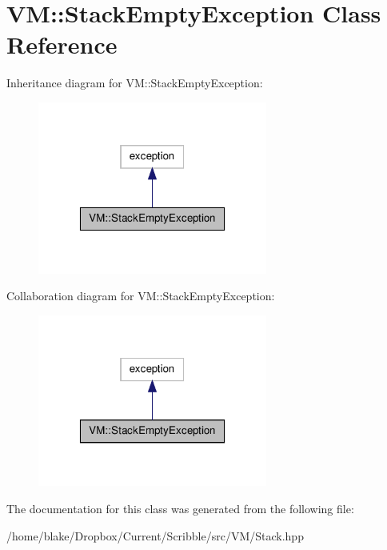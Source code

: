 \hypertarget{class_v_m_1_1_stack_empty_exception}{\section{V\-M\-:\-:Stack\-Empty\-Exception Class Reference}
\label{class_v_m_1_1_stack_empty_exception}
}


Inheritance diagram for V\-M\-:\-:Stack\-Empty\-Exception\-:
\nopagebreak
\begin{figure}[H]
\begin{center}
\leavevmode
\includegraphics[width=214pt]{class_v_m_1_1_stack_empty_exception__inherit__graph}
\end{center}
\end{figure}


Collaboration diagram for V\-M\-:\-:Stack\-Empty\-Exception\-:
\nopagebreak
\begin{figure}[H]
\begin{center}
\leavevmode
\includegraphics[width=214pt]{class_v_m_1_1_stack_empty_exception__coll__graph}
\end{center}
\end{figure}


The documentation for this class was generated from the following file\-:\begin{DoxyCompactItemize}
\item 
/home/blake/\-Dropbox/\-Current/\-Scribble/src/\-V\-M/Stack.\-hpp\end{DoxyCompactItemize}
